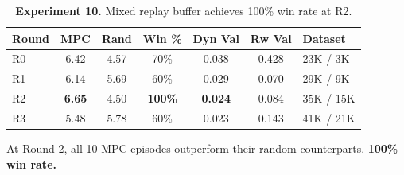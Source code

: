 \documentclass{article}
\begin{document}
\begin{table}[H]
\centering
\caption{\textbf{Experiment 10.} Mixed replay buffer achieves 100\% win rate at R2.}
\label{tab:exp10}
\begin{tabular}{lcccccl}
\toprule
\textbf{Round} & \textbf{MPC} & \textbf{Rand} & \textbf{Win \%} & \textbf{Dyn Val} & \textbf{Rw Val} & \textbf{Dataset} \\
\midrule
R0 & 6.42 & 4.57 & 70\% & 0.038 & 0.428 & 23K / 3K \\
R1 & 6.14 & 5.69 & 60\% & 0.029 & 0.070 & 29K / 9K \\
\rowcolor{green!8} R2 & \textbf{6.65} & 4.50 & \textbf{100\%} & \textbf{0.024} & 0.084 & 35K / 15K \\
\rowcolor{red!8} R3 & 5.48 & 5.78 & 60\% & 0.023 & 0.143 & 41K / 21K \\
\bottomrule
\end{tabular}
\end{table}

At Round 2, all 10 MPC episodes outperform their random counterparts. \textbf{100\% win rate.}
\end{document}
